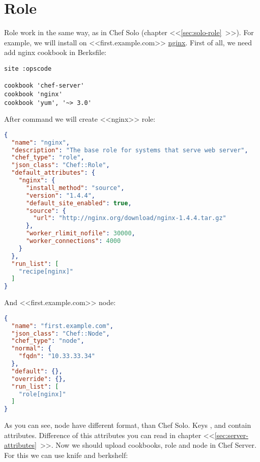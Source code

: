 \section{Role}
\label{sec:server-role}

Role work in the same way, as in Chef Solo (chapter <<\ref{sec:solo-role}~>>). For example, we will install on <<first.example.com>> \href{http://community.opscode.com/cookbooks/nginx}{nginx}. First of all, we need add nginx cookbook in Berksfile:

\begin{lstlisting}[label=lst:my-serer-cloud-role1,title=my-server-cloud/Berksfile]
site :opscode

cookbook 'chef-server'
cookbook 'nginx'
cookbook 'yum', '~> 3.0'
\end{lstlisting}

After command  we will create <<nginx>> role:

\begin{lstlisting}[language=JSON,label=lst:my-serer-cloud-role2,title=my-server-cloud/roles/nginx.json]
{
  "name": "nginx",
  "description": "The base role for systems that serve web server",
  "chef_type": "role",
  "json_class": "Chef::Role",
  "default_attributes": {
    "nginx": {
      "install_method": "source",
      "version": "1.4.4",
      "default_site_enabled": true,
      "source": {
        "url": "http://nginx.org/download/nginx-1.4.4.tar.gz"
      },
      "worker_rlimit_nofile": 30000,
      "worker_connections": 4000
    }
  },
  "run_list": [
    "recipe[nginx]"
  ]
}
\end{lstlisting}

And <<first.example.com>> node:

\begin{lstlisting}[language=JSON,label=lst:my-serer-cloud-role3,title=my-server-cloud/nodes/first.example.com.json]
{
  "name": "first.example.com",
  "json_class": "Chef::Node",
  "chef_type": "node",
  "normal": {
    "fqdn": "10.33.33.34"
  },
  "default": {},
  "override": {},
  "run_list": [
    "role[nginx]"
  ]
}
\end{lstlisting}

As you can see, node have different format, than Chef Solo. Keys ,  and  contain attributes. Difference of this attributes you can read in chapter <<\ref{sec:server-attributes}~>>. Now we should upload cookbooks, role and node in Chef Server. For this we can use knife and berkshelf:

